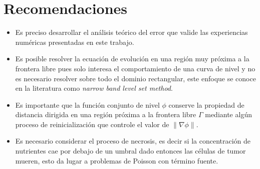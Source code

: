 \chapter{Recomendaciones}\thispagestyle{fancy}
\begin{itemize}
	\item Es preciso desarrollar el análisis teórico del error que valide las experiencias numéricas presentadas en este trabajo.
	\item Es posible resolver la ecuación de evolución  en una región muy próxima a la frontera libre pues solo interesa el comportamiento de una curva de nivel y no es necesario resolver sobre todo el dominio rectangular, este enfoque se conoce en la literatura como \emph{narrow band level set method}.
	\item Es importante que la función conjunto de nivel  $\phi$ conserve la propiedad de distancia dirigida en una región próxima a la frontera libre $\Gamma$ mediante algún proceso de reinicialización que controle el valor de $\|\nabla \phi \|$.
	\item Es necesario considerar el proceso de necrosis, es decir si la concentración de nutrientes cae por debajo de un umbral dado entonces las células de tumor mueren, esto da lugar a problemas de Poisson con término fuente. 
\end{itemize}
